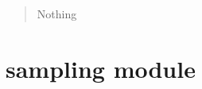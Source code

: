 \documentclass[letterpaper,10pt,english]{sphinxmanual}
\begin{document}
\begin{fulllineitems}
\begin{fulllineitems}
\begin{quote}
\begin{description}
\begin{itemize}
\end{itemize}

\sphinxAtStartPar
Nothing

\end{description}\end{quote}

\end{fulllineitems}


\end{fulllineitems}


\sphinxstepscope


\section{sampling module}
\label{\detokenize{baseModules/sampling:module-sampling}}\label{\detokenize{baseModules/sampling:sampling-module}}\label{\detokenize{baseModules/sampling::doc}}
\end{document}
